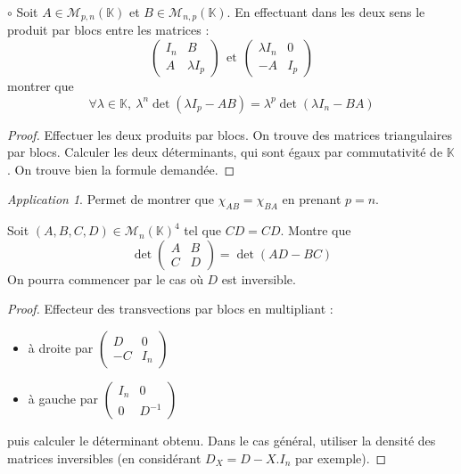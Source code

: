 \documentclass[french,a4paper]{article}
\newcommand{\K}{\mathbb{K}}
\newcommand{\inv}{^{-1}}
\theoremstyle{plain}
\theoremstyle{definition}
\theoremstyle{remark}
\newtheorem*{app}{Application}
\begin{document}
\begin{ex}{$\circ$}
	Soit $A\in\mathcal{M}_{p,n}(\K)$ et $B\in\mathcal{M}_{n,p}(\K)$. En effectuant dans les deux sens le produit par blocs entre les matrices : $$\begin{pmatrix}
		I_n&B\\
		A&\lambda I_p
	\end{pmatrix}\ \ \text{et} \ \ \begin{pmatrix}
		\lambda I_n&0\\
		-A&I_p
	\end{pmatrix}$$ montrer que $$\forall\lambda\in\K,\ \lambda^n\det(\lambda I_p-AB)=\lambda^p\det(\lambda I_n-BA)$$
\end{ex}
\begin{proof}
	Effectuer les deux produits par blocs. On trouve des matrices triangulaires par blocs. Calculer les deux déterminants, qui sont égaux par commutativité de $\K$. On trouve bien la formule demandée.
\end{proof}
\begin{app}
	Permet de montrer que $\chi_{AB}=\chi_{BA}$ en prenant $p=n$.
\end{app}

\begin{ex}{}
	Soit $(A,B,C,D)\in\mathcal{M}_n(\K)^4$ tel que $CD=CD$. Montre que $$\det\begin{pmatrix}
		A&B\\
		C&D
	\end{pmatrix}=\det(AD-BC)$$ On pourra commencer par le cas où $D$ est inversible.
\end{ex}
\begin{proof}
	Effecteur des transvections par blocs en multipliant :
	\begin{itemize}
		\item à droite par $\displaystyle\begin{pmatrix}
			D&0\\
			-C&I_n
		\end{pmatrix}$
		\item à gauche par $\displaystyle\begin{pmatrix}
			I_n&0\\
			0&D\inv
		\end{pmatrix}$
	\end{itemize} puis calculer le déterminant obtenu. Dans le cas général, utiliser la densité des matrices inversibles (en considérant $D_X=D-X.I_n$ par exemple).
\end{proof}
\end{document}
